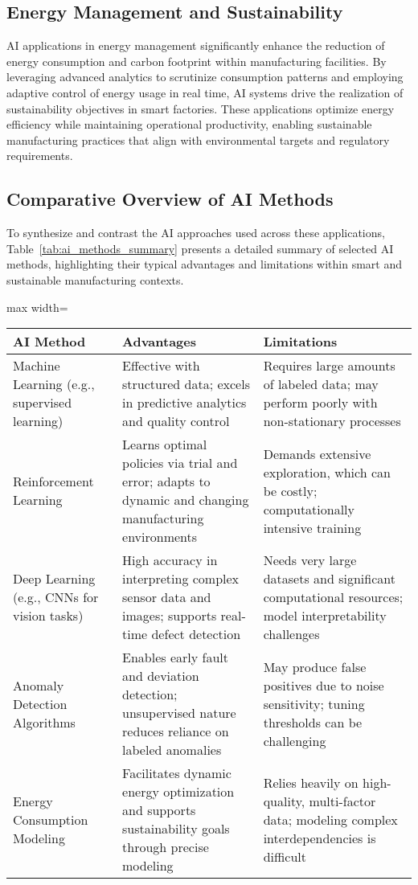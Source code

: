 \documentclass[sigconf]{acmart}
\begin{document}
\subsection{Energy Management and Sustainability}
AI applications in energy management significantly enhance the reduction of energy consumption and carbon footprint within manufacturing facilities. By leveraging advanced analytics to scrutinize consumption patterns and employing adaptive control of energy usage in real time, AI systems drive the realization of sustainability objectives in smart factories. These applications optimize energy efficiency while maintaining operational productivity, enabling sustainable manufacturing practices that align with environmental targets and regulatory requirements.

\subsection{Comparative Overview of AI Methods}
To synthesize and contrast the AI approaches used across these applications, Table~\ref{tab:ai_methods_summary} presents a detailed summary of selected AI methods, highlighting their typical advantages and limitations within smart and sustainable manufacturing contexts.

\begin{table*}[htbp]
\centering
\caption{Summary of AI Methods Applied in Smart and Sustainable Manufacturing}
\label{tab:ai_methods_summary}
\begin{adjustbox}{max width=\textwidth}
\begin{tabular}{@{}lll@{}}
\toprule
\textbf{AI Method} & \textbf{Advantages} & \textbf{Limitations} \\ \midrule
Machine Learning (e.g., supervised learning) & Effective with structured data; excels in predictive analytics and quality control & Requires large amounts of labeled data; may perform poorly with non-stationary processes \\[6pt]
Reinforcement Learning & Learns optimal policies via trial and error; adapts to dynamic and changing manufacturing environments & Demands extensive exploration, which can be costly; computationally intensive training \\[6pt]
Deep Learning (e.g., CNNs for vision tasks) & High accuracy in interpreting complex sensor data and images; supports real-time defect detection & Needs very large datasets and significant computational resources; model interpretability challenges \\[6pt]
Anomaly Detection Algorithms & Enables early fault and deviation detection; unsupervised nature reduces reliance on labeled anomalies & May produce false positives due to noise sensitivity; tuning thresholds can be challenging \\[6pt]
Energy Consumption Modeling & Facilitates dynamic energy optimization and supports sustainability goals through precise modeling & Relies heavily on high-quality, multi-factor data; modeling complex interdependencies is difficult \\ \bottomrule
\end{tabular}
\end{adjustbox}
\end{table*}
\end{document}
